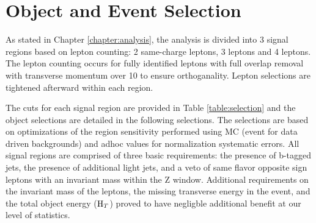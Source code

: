 \chapter[Object and Event Selection][Object and Event Selection]{Object and Event Selection}
\label{chapter:selection}

As stated in Chapter \ref{chapter:analysis}, the analysis is divided into 3 signal regions based
on lepton counting: 2 same-charge leptons, 3 leptons and 4 leptons. The lepton
counting occurs for fully identified leptons with full overlap removal with
transverse momentum over 10 \gev to ensure orthoganality. Lepton selections are tightened
afterward within each region.

The cuts for each signal region are provided in Table \ref{table:selection} and the object selections are detailed in the
following selections. The selections are based on optimizations of the region sensitivity
performed using MC (event for data driven backgrounds) and adhoc values for normalization systematic errors.
All signal regions are comprised of three basic requirements: the presence of b-tagged
jets, the presence of additional light jets, and a veto of same flavor opposite sign leptons with an
invariant mass within the Z window. Additional requirements on the invariant mass of the leptons, the missing transverse energy
in the event, and the total object energy ($\rm H_{T}$) proved to have negligble additional benefit at our level of 
statistics.

